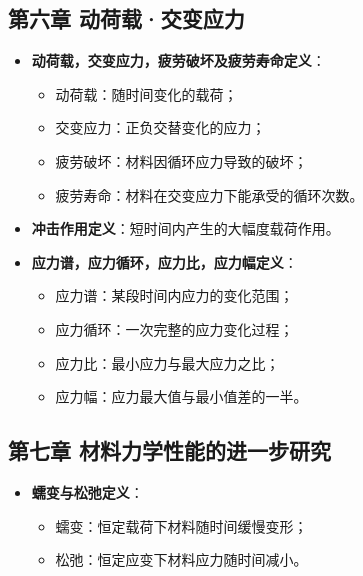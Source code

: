 \documentclass[12pt,a4paper]{article}
\begin{document}
\subsection*{第六章 动荷载·交变应力}
\begin{itemize}
  \item \textbf{动荷载，交变应力，疲劳破坏及疲劳寿命定义}：
    \begin{itemize}
      \item 动荷载：随时间变化的载荷；
      \item 交变应力：正负交替变化的应力；
      \item 疲劳破坏：材料因循环应力导致的破坏；
      \item 疲劳寿命：材料在交变应力下能承受的循环次数。
    \end{itemize}
  \item \textbf{冲击作用定义}：短时间内产生的大幅度载荷作用。
  \item \textbf{应力谱，应力循环，应力比，应力幅定义}：
    \begin{itemize}
      \item 应力谱：某段时间内应力的变化范围；
      \item 应力循环：一次完整的应力变化过程；
      \item 应力比：最小应力与最大应力之比；
      \item 应力幅：应力最大值与最小值差的一半。
    \end{itemize}
\end{itemize}

\subsection*{第七章 材料力学性能的进一步研究}
\begin{itemize}
  \item \textbf{蠕变与松弛定义}：
    \begin{itemize}
      \item 蠕变：恒定载荷下材料随时间缓慢变形；
      \item 松弛：恒定应变下材料应力随时间减小。
    \end{itemize}
\end{itemize}


\newpage
\end{document}
